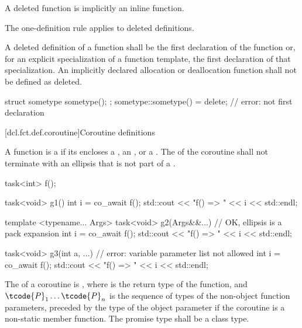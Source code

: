 \pnum
A deleted function is implicitly an inline function.
\begin{note}
The
one-definition rule applies to deleted definitions.
\end{note}
A deleted definition of a function shall be the first declaration of the function or,
for an explicit specialization of a function template, the first declaration of that
specialization.
An implicitly declared allocation or deallocation function
shall not be defined as deleted.
\begin{example}
\begin{codeblock}
struct sometype {
  sometype();
};
sometype::sometype() = delete;  // error: not first declaration
\end{codeblock}
\end{example}

[dcl.fct.def.coroutine]{Coroutine definitions}%
%

\pnum
A function is a  if its  encloses a
,
an ,
or a .
The  of the coroutine shall not
terminate with an ellipsis that is not part of
a .

\pnum
\begin{example}
\begin{codeblock}
task<int> f();

task<void> g1() {
  int i = co_await f();
  std::cout << "f() => " << i << std::endl;
}

template <typename... Args>
task<void> g2(Args&&...) {      // OK, ellipsis is a pack expansion
  int i = co_await f();
  std::cout << "f() => " << i << std::endl;
}

task<void> g3(int a, ...) {     // error: variable parameter list not allowed
  int i = co_await f();
  std::cout << "f() => " << i << std::endl;
}
\end{codeblock}
\end{example}

\pnum
{}%
The  of a coroutine is
,
where
 is the return type of the function, and
$\tcode{P}_1 \dotsc \tcode{P}_n$ is the sequence of types of the non-object function parameters,
preceded by the type of the object parameter
if the coroutine is a non-static member function.
The promise type shall be a class type.

